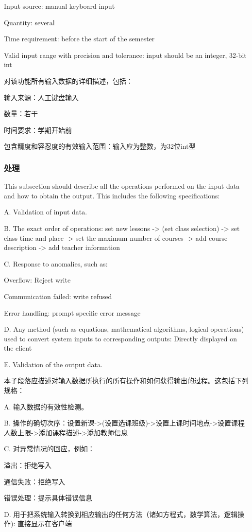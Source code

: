 Input source: manual keyboard input

Quantity: several

Time requirement: before the start of the semester

Valid input range with precision and tolerance: input should be an integer, 32-bit int

对该功能所有输入数据的详细描述，包括：

		输入来源：人工键盘输入

		数量：若干

		时间要求：学期开始前

		包含精度和容忍度的有效输入范围：输入应为整数，为32位int型		

\subsubsection{处理}
This subsection should describe all the operations performed on the input data and how to obtain the output. This includes the following specifications:

A. Validation of input data.

B. The exact order of operations: set new lessons -> (set class selection) -> set class time and place -> set the maximum number of courses -> add course description -> add teacher information

C. Response to anomalies, such as:

Overflow: Reject write

Communication failed: write refused

Error handling: prompt specific error message

D. Any method (such as equations, mathematical algorithms, logical operations) used to convert system inputs to corresponding outputs:
Directly displayed on the client

E. Validation of the output data.

本子段落应描述对输入数据所执行的所有操作和如何获得输出的过程。这包括下列规格：

A. 输入数据的有效性检测。

B. 操作的确切次序：设置新课->(设置选课班级)->设置上课时间地点->设置课程人数上限->添加课程描述->添加教师信息

C. 对异常情况的回应，例如：
		
	溢出：拒绝写入

	通信失败：拒绝写入
	
	错误处理：提示具体错误信息
	
D. 用于把系统输入转换到相应输出的任何方法（诸如方程式，数学算法，逻辑操作):
	直接显示在客户端
		
